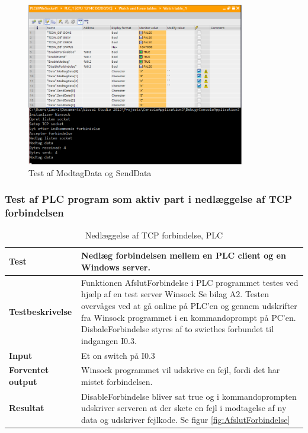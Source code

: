 \begin{figure}[H] %
	\centering
	\includegraphics[width=0.85\textwidth]{Test/ModultestStyringsenhed/ModtagDataOgSendData}
	\caption{Test af ModtagData og SendData}
	\label{fig:ModtagDataOgSendData}
\end{figure}

\subsubsection{Test af PLC program som aktiv part i nedlæggelse af TCP forbindelsen}

\begin{table}[H]
	\centering
	\begin{tabular}{ | m{} | m{}|} 
		\hline
		\textbf{Test}					&Nedlæg forbindelsen mellem en PLC client og en Windows server.\\ \hline
		\textbf{Testbeskrivelse}		&Funktionen AfslutForbindelse i PLC programmet testes ved hjælp af en test server Winsock Se bilag A2. Testen overvåges ved at gå online på PLC'en og gennem udskrifter fra Winsock programmet i en kommandoprompt på PC'en. DisbaleForbindelse styres af to swicthes forbundet til indgangen I0.3. \\ \hline
		\textbf{Input}					& Et on switch på I0.3\\ \hline
		\textbf{Forventet output}		&Winsock programmet vil udskrive en fejl, fordi det har mistet forbindelsen. \\ \hline
		\textbf{Resultat}				&DisableForbindelse bliver sat true og i kommandoprompten udskriver serveren at der skete en fejl i modtagelse af ny data og udskriver fejlkode. Se figur \ref{fig:AfslutForbindelse} \\ \hline
	\end{tabular}
	\caption{Nedlæggelse af TCP forbindelse, PLC} 
	\label{tab:PLCnedlaegForbindelse}
\end{table}

